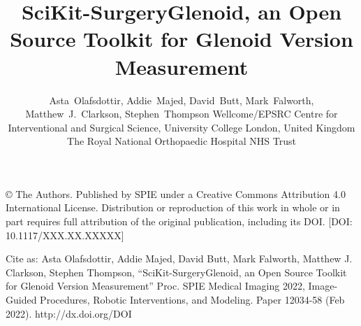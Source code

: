 \documentclass[a4paper, lmargin=1.925cm, rmargin=1.925cm,tmargin=2.54cm,bmargin=4.94cm]{spie}
\begin{document}
%
%
\pagestyle{plain}
%
%
\title{SciKit-SurgeryGlenoid, an Open Source Toolkit for Glenoid Version Measurement}
%
\author{Asta~Olafsdottir, Addie~Majed, David~Butt, Mark~Falworth,
Matthew~J.~Clarkson,
Stephen~Thompson
\skiplinehalf
{}Wellcome/EPSRC Centre for Interventional and Surgical Science, University College London, United Kingdom \\
The Royal National Orthopaedic Hospital NHS Trust\\
}

\maketitle              %

\begin{center}
	© The Authors. Published by SPIE under a Creative Commons Attribution 4.0 International License. Distribution or reproduction of this work in whole or in part requires full attribution of the original publication, including its DOI. [DOI: 10.1117/XXX.XX.XXXXX]

	Cite as: Asta Olafsdottir, Addie Majed, David Butt, Mark Falworth, Matthew J. Clarkson, Stephen Thompson, “SciKit-SurgeryGlenoid, an Open Source Toolkit for Glenoid Version Measurement” Proc. SPIE Medical Imaging 2022, Image-Guided Procedures, Robotic Interventions, and Modeling. Paper 12034-58 (Feb 2022). http://dx.doi.org/DOI
\end{center}

\begin{abstract}

\end{abstract}






%



\end{document}
